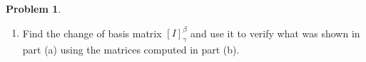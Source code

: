 \documentclass[10pt]{article}
\theoremstyle{definition}
\newtheorem{problem}{Problem}
\begin{document}
\begin{problem}
\begin{enumerate}
$$\begin{pmatrix}
            1 & 1 \\
            1 & 0
          \end{pmatrix},
          \begin{pmatrix}
            1 & 3 \\
            2 & 3
          \end{pmatrix},
          \begin{pmatrix}
            2 & 6 \\
            1 & 4
          \end{pmatrix}\right\}.$$
  \item Find the change of basis matrix $\left[I\right]_\gamma^\beta$ and use it to verify what was shown in part (a) using the matrices computed in part (b).
\end{enumerate}
\end{problem}
\end{document}
